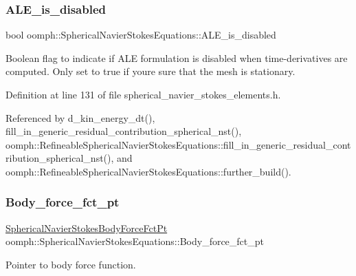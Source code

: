 \subsubsection{\texorpdfstring{A\+L\+E\+\_\+is\+\_\+disabled}{ALE\_is\_disabled}}
{\footnotesize\ttfamily bool oomph\+::\+Spherical\+Navier\+Stokes\+Equations\+::\+A\+L\+E\+\_\+is\+\_\+disabled\hspace{0.3cm}{\ttfamily [protected]}}



Boolean flag to indicate if A\+LE formulation is disabled when time-\/derivatives are computed. Only set to true if you\textquotesingle{}re sure that the mesh is stationary. 



Definition at line 131 of file spherical\+\_\+navier\+\_\+stokes\+\_\+elements.\+h.



Referenced by d\+\_\+kin\+\_\+energy\+\_\+dt(), fill\+\_\+in\+\_\+generic\+\_\+residual\+\_\+contribution\+\_\+spherical\+\_\+nst(), oomph\+::\+Refineable\+Spherical\+Navier\+Stokes\+Equations\+::fill\+\_\+in\+\_\+generic\+\_\+residual\+\_\+contribution\+\_\+spherical\+\_\+nst(), and oomph\+::\+Refineable\+Spherical\+Navier\+Stokes\+Equations\+::further\+\_\+build().

\mbox{\label{classoomph_1_1SphericalNavierStokesEquations_ad1847f826dc0e33cb793319bfa41d985}} 
\subsubsection{\texorpdfstring{Body\+\_\+force\+\_\+fct\+\_\+pt}{Body\_force\_fct\_pt}}
{\footnotesize\ttfamily \hyperlink{classoomph_1_1SphericalNavierStokesEquations_aee36bea87063e9648a488de9e21f551d}{Spherical\+Navier\+Stokes\+Body\+Force\+Fct\+Pt} oomph\+::\+Spherical\+Navier\+Stokes\+Equations\+::\+Body\+\_\+force\+\_\+fct\+\_\+pt\hspace{0.3cm}{\ttfamily [protected]}}



Pointer to body force function. 



